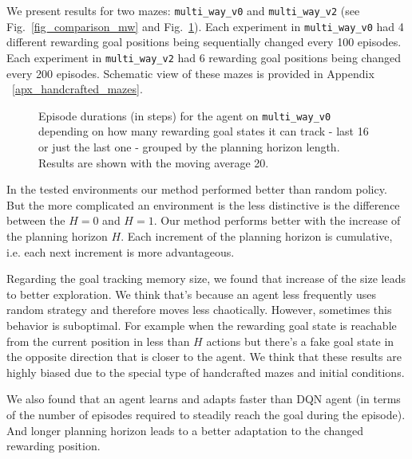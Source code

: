 \documentclass[a4paper,twoside]{article}
\begin{document}
We present results for two mazes: \texttt{multi\_way\_v0} and \texttt{multi\_way\_v2} (see Fig.~\ref{fig_comparison_mw} and Fig.~\ref{fig_detailed_mw0}). Each experiment in \texttt{multi\_way\_v0} had 4 different rewarding goal positions being sequentially changed every 100 episodes. Each experiment in \texttt{multi\_way\_v2} had 6 rewarding goal positions being changed every 200 episodes. Schematic view of these mazes is provided in Appendix ~\ref{apx_handcrafted_mazes}.

\begin{figure}
  \centering
  \begin{minipage}{\linewidth}
    
    \vspace*{10pt}

    
    \vspace*{6pt}
  \end{minipage}

  \caption{Episode durations (in steps) for the agent on \texttt{multi\_way\_v0} depending on how many rewarding goal states it can track - last 16 or just the last one - grouped by the planning horizon length. Results are shown with the moving average 20.} \label{fig_detailed_mw0}
\end{figure}

In the tested environments our method performed better than random policy. But the more complicated an environment is the less distinctive is the difference between the $H = 0$ and $H = 1$. Our method performs better with the increase of the planning horizon $H$. Each increment of the planning horizon is cumulative, i.e. each next increment is more advantageous.

Regarding the goal tracking memory size, we found that increase of the size leads to better exploration. We think that's because an agent less frequently uses random strategy and therefore moves less chaotically. However, sometimes this behavior is suboptimal. For example when the rewarding goal state is reachable from the current position in less than $H$ actions but there's a fake goal state in the opposite direction that is closer to the agent. We think that these results are highly biased due to the special type of handcrafted mazes and initial conditions.
  
We also found that an agent learns and adapts faster than DQN agent (in terms of the number of episodes required to steadily reach the goal during the episode). And longer planning horizon leads to a better adaptation to the changed rewarding position.
\end{document}
